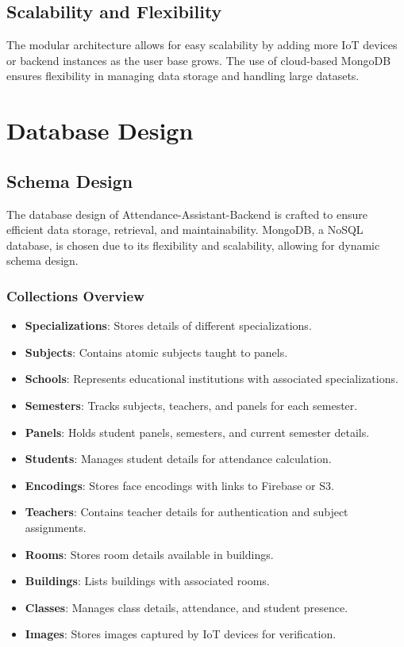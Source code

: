 \documentclass[conference]{IEEEtran}
\begin{document}
\subsection{Scalability and Flexibility}
The modular architecture allows for easy scalability by adding more IoT devices or backend instances as the user base grows. The use of cloud-based MongoDB ensures flexibility in managing data storage and handling large datasets.

\section{Database Design}
\subsection{Schema Design}
The database design of Attendance-Assistant-Backend is crafted to ensure efficient data storage, retrieval, and maintainability. MongoDB, a NoSQL database, is chosen due to its flexibility and scalability, allowing for dynamic schema design.

\subsubsection{Collections Overview}
\begin{itemize}
    \item \textbf{Specializations}: Stores details of different specializations.
    \item \textbf{Subjects}: Contains atomic subjects taught to panels.
    \item \textbf{Schools}: Represents educational institutions with associated specializations.
    \item \textbf{Semesters}: Tracks subjects, teachers, and panels for each semester.
    \item \textbf{Panels}: Holds student panels, semesters, and current semester details.
    \item \textbf{Students}: Manages student details for attendance calculation.
    \item \textbf{Encodings}: Stores face encodings with links to Firebase or S3.
    \item \textbf{Teachers}: Contains teacher details for authentication and subject assignments.
    \item \textbf{Rooms}: Stores room details available in buildings.
    \item \textbf{Buildings}: Lists buildings with associated rooms.
    \item \textbf{Classes}: Manages class details, attendance, and student presence.
    \item \textbf{Images}: Stores images captured by IoT devices for verification.
\end{itemize}
\end{document}

